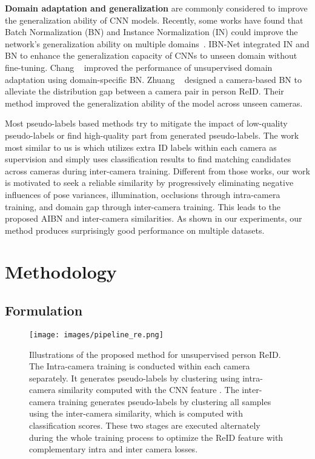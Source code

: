 \documentclass[final]{cvpr}
\begin{document}
\textbf{Domain adaptation and generalization} are commonly considered to improve the generalization ability of CNN models. Recently, some works have found that Batch Normalization (BN) \cite{BN} and Instance Normalization (IN) \cite{IN} could improve the network's generalization ability on multiple domains~\cite{zhuangrethinking, IBNNet, chang2019domain}. 
IBN-Net \cite{IBNNet} integrated IN and BN to enhance the generalization capacity of CNNs to unseen domain without fine-tuning. Chang \etal~\cite{chang2019domain} improved the performance of unsupervised domain adaptation using domain-specific BN. Zhuang \etal~\cite{zhuangrethinking} designed a camera-based BN to alleviate the distribution gap between a camera pair in person ReID. Their method improved the generalization ability of the model across unseen cameras. 

Most pseudo-labels based methods try to mitigate the impact of low-quality pseudo-labels or find high-quality part from generated pseudo-labels.
The work most similar to us is \cite{zhu2021intracamera} which utilizes extra ID labels within each camera as supervision and simply uses classification results to find matching candidates across cameras during inter-camera training.
Different from those works, our work is motivated to seek a reliable similarity by progressively eliminating negative influences of pose variances, illumination, occlusions through intra-camera training, and domain gap through inter-camera
training. This leads to the proposed AIBN and inter-camera similarities.
As shown in our experiments, our method produces surprisingly good performance on multiple datasets.



\section{Methodology}
\subsection{Formulation} \label{sec:formulate}

\begin{figure}
	\centering
	\vspace{-1mm}
	\texttt{[image: images/pipeline\_re.png]}
	\caption{Illustrations of the proposed method for unsupervised person ReID. The Intra-camera training is conducted within each camera separately. It generates pseudo-labels by clustering using intra-camera similarity computed with the CNN feature . The inter-camera training generates pseudo-labels by clustering all samples using the inter-camera similarity, which is computed with classification scores. These two stages are executed alternately during the whole training process to optimize the ReID feature  with complementary intra and inter camera losses.}
	\label{fig:detail_pipeline}
\end{figure}
\end{document}
